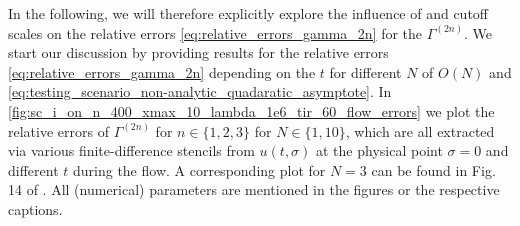 In the following, we will therefore explicitly explore the influence of \uv{}  and \ir{} cutoff scales on the relative errors \eqref{eq:relative_errors_gamma_2n} for the $\Gamma^{(2n)}$.
We start our discussion by providing results for the relative errors \eqref{eq:relative_errors_gamma_2n} depending on the \rgtime{} $t$ for different $N$ of $O(N)$ and \uv{} \ic{} \eqref{eq:testing_scenario_non-analytic_quadaratic_asymptote}.
In \cref{fig:sc_i_on_n_400_xmax_10_lambda_1e6_tir_60_flow_errors} we plot the relative errors of $\Gamma^{(2n)}$ for $n\in\{ 1, 2, 3\}$ for $N \in\{1, 10\}$, which are all extracted via various finite-difference stencils from $u ( t, \sigma )$ at the physical point $\sigma = 0$ and different $t$ during the \frg{} flow.
A corresponding plot for $N=3$ can be found in Fig. 14 of .
All (numerical) parameters are mentioned in the figures or the respective captions.

